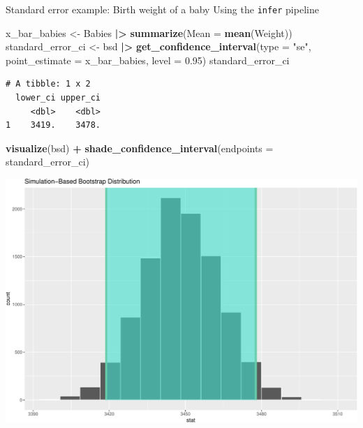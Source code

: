 \documentclass[
  ignorenonframetext,
]{beamer}
\newenvironment{Shaded}{\begin{snugshade}}{\end{snugshade}}
\newcommand{\AttributeTok}[1]{\textcolor[rgb]{0.13,0.29,0.53}{#1}}
\newcommand{\FloatTok}[1]{\textcolor[rgb]{0.00,0.00,0.81}{#1}}
\newcommand{\FunctionTok}[1]{\textcolor[rgb]{0.13,0.29,0.53}{\textbf{#1}}}
\newcommand{\NormalTok}[1]{#1}
\newcommand{\OtherTok}[1]{\textcolor[rgb]{0.56,0.35,0.01}{#1}}
\newcommand{\SpecialCharTok}[1]{\textcolor[rgb]{0.81,0.36,0.00}{\textbf{#1}}}
\newcommand{\StringTok}[1]{\textcolor[rgb]{0.31,0.60,0.02}{#1}}
\begin{document}
\begin{frame}[fragile]{Standard error example: Birth weight of a baby}
\protect\hypertarget{standard-error-example-birth-weight-of-a-baby}{}
Using the \texttt{infer} pipeline

\tiny

\begin{Shaded}
\begin{Highlighting}[]
\NormalTok{x\_bar\_babies }\OtherTok{\textless{}{-}}\NormalTok{ Babies }\SpecialCharTok{|\textgreater{}} \FunctionTok{summarize}\NormalTok{(}\AttributeTok{Mean =} \FunctionTok{mean}\NormalTok{(Weight))}
\NormalTok{standard\_error\_ci }\OtherTok{\textless{}{-}}\NormalTok{ bsd }\SpecialCharTok{|\textgreater{}} 
  \FunctionTok{get\_confidence\_interval}\NormalTok{(}\AttributeTok{type =} \StringTok{"se"}\NormalTok{, }\AttributeTok{point\_estimate =}\NormalTok{ x\_bar\_babies, }\AttributeTok{level =} \FloatTok{0.95}\NormalTok{)}
\NormalTok{standard\_error\_ci}
\end{Highlighting}
\end{Shaded}

\begin{verbatim}
# A tibble: 1 x 2
  lower_ci upper_ci
     <dbl>    <dbl>
1    3419.    3478.
\end{verbatim}

\begin{Shaded}
\begin{Highlighting}[]
\FunctionTok{visualize}\NormalTok{(bsd) }\SpecialCharTok{+} 
  \FunctionTok{shade\_confidence\_interval}\NormalTok{(}\AttributeTok{endpoints =}\NormalTok{ standard\_error\_ci)}
\end{Highlighting}
\end{Shaded}

\begin{center}\includegraphics[width=0.7\linewidth,height=0.4\textheight]{Week10_Lect_files/figure-beamer/unnamed-chunk-21-1} \end{center}
\normalsize
\end{frame}
\end{document}
